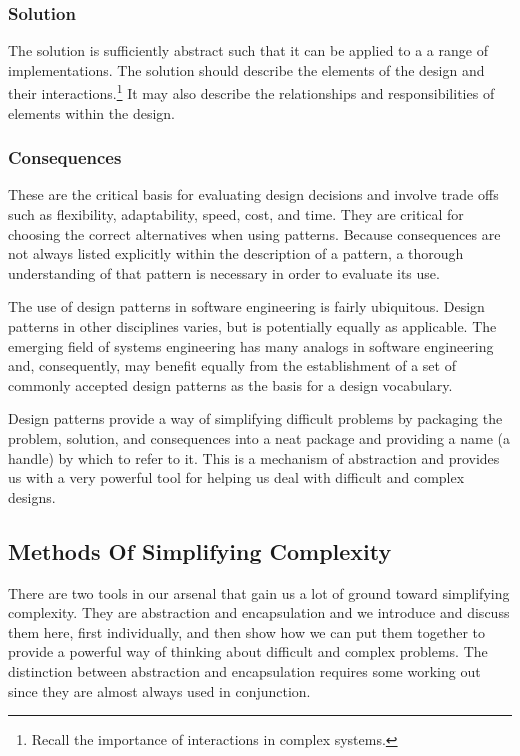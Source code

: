 \documentclass[jou,apacite]{apa6}
\begin{document}
\subsubsection{Solution}
The solution is sufficiently abstract such that it can be applied to a a range of implementations.  The solution should describe the elements of the design and their interactions.\footnote{Recall the importance of interactions in complex systems.}  It may also describe the relationships and responsibilities of elements within the design.

\subsubsection{Consequences}
These are the critical basis for evaluating design decisions and involve trade offs such as flexibility, adaptability, speed, cost, and time.  They are critical for choosing the correct alternatives when using patterns.  Because consequences are not always  listed explicitly within the description of a pattern, a thorough understanding of that pattern is necessary in order to evaluate its use.

The use of design patterns in software engineering is fairly ubiquitous.  Design patterns in other disciplines varies, but is potentially equally as applicable.  The emerging field of systems engineering has many analogs in software engineering and, consequently, may benefit equally from the establishment of a set of commonly accepted design patterns as the basis for a design vocabulary.

Design patterns provide a way of simplifying difficult problems by packaging the problem, solution, and consequences into a neat package and providing a name (a handle) by which to refer to it.  This is a mechanism of abstraction and provides us with a very powerful tool for helping us deal with difficult and complex designs.

\subsection{Methods Of Simplifying Complexity}  %
There are two tools in our arsenal that gain us a lot of ground toward simplifying complexity.  They are abstraction and encapsulation and we introduce and discuss them here, first individually, and then show how we can put them together to provide a powerful way of thinking about difficult and complex problems.  The distinction between abstraction and encapsulation requires some working out since they are almost always used in conjunction.
\end{document}
